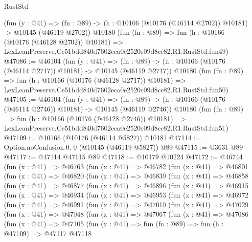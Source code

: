 \begin{lexlean}{RustStd}
\begin{coremodule}
    (fun (y : @41) =>
    (fn : @89) -> (h : @10166 (@10176 (@46114 @2702)) @10181) -> @10145 (@46119 @2702))
    @10180
    (fun (fn : @89) =>
    fun (h : @10166 (@10176 (@46128 @2702)) @10181) =>
    LexLeanPreserve.Ce51bdd840d7602eca0e2520e09d8ce82.R1.RustStd.fun49)
@47086 := @46104
    (fun (y : @41) =>
    (fn : @89) -> (h : @10166 (@10176 (@46114 @2717)) @10181) -> @10145 (@46119 @2717))
    @10180
    (fun (fn : @89) =>
    fun (h : @10166 (@10176 (@46128 @2717)) @10181) =>
    LexLeanPreserve.Ce51bdd840d7602eca0e2520e09d8ce82.R1.RustStd.fun50)
@47105 := @46104
    (fun (y : @41) =>
    (fn : @89) -> (h : @10166 (@10176 (@46114 @2746)) @10181) -> @10145 (@46119 @2746))
    @10180
    (fun (fn : @89) =>
    fun (h : @10166 (@10176 (@46128 @2746)) @10181) =>
    LexLeanPreserve.Ce51bdd840d7602eca0e2520e09d8ce82.R1.RustStd.fun51)
@47109 := @10166 (@10176 (@46114 @5827)) @10181
@47114 := Option.noConfusion.{0, 0} (@10145 (@46119 @5827)) @89
@47115 := @3631 @89
@47117 := @47114 @47115 @89
@47118 := @10179 @10224
@47172 := @46744
    (fun (x : @41) =>
    @46763
      (fun (x : @41) =>
      @46782
        (fun (x : @41) =>
        @46801
          (fun (x : @41) =>
          @46820
            (fun (x : @41) =>
            @46839
              (fun (x : @41) =>
              @46858
                (fun (x : @41) =>
                @46877
                  (fun (x : @41) =>
                  @46896
                    (fun (x : @41) =>
                    @46915
                      (fun (x : @41) =>
                      @46934
                        (fun (x : @41) =>
                        @46953
                          (fun (x : @41) =>
                          @46972
                            (fun (x : @41) =>
                            @46991
                              (fun (x : @41) =>
                              @47010
                                (fun (x : @41) =>
                                @47029
                                  (fun (x : @41) =>
                                  @47048
                                    (fun (x : @41) =>
                                    @47067
                                      (fun (x : @41) =>
                                      @47086
                                        (fun (x : @41) =>
                                        @47105
                                          (fun (x : @41) =>
                                          fun (fn : @89) =>
                                          fun (h : @47109) =>
                                          @47117
                                            @47118

\end{coremodule}
\end{lexlean}

